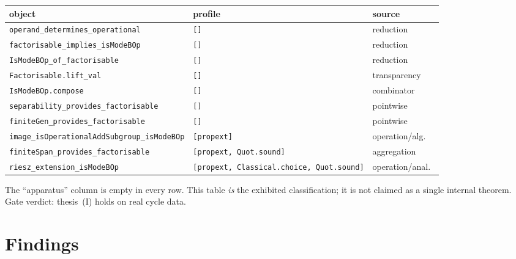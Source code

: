 \begin{center}
\begin{tabular}{lll}
\textbf{object} & \textbf{profile} & \textbf{source} \\
\hline
\texttt{operand\_determines\_operational}      & \texttt{[]}        & reduction \\
\texttt{factorisable\_implies\_isModeBOp}       & \texttt{[]}        & reduction \\
\texttt{IsModeBOp\_of\_factorisable}            & \texttt{[]}        & reduction \\
\texttt{Factorisable.lift\_val}                 & \texttt{[]}        & transparency \\
\texttt{IsModeBOp.compose}                      & \texttt{[]}        & combinator \\
\texttt{separability\_provides\_factorisable}   & \texttt{[]}        & pointwise \\
\texttt{finiteGen\_provides\_factorisable}      & \texttt{[]}        & pointwise \\
\texttt{image\_isOperationalAddSubgroup\_isModeBOp} & \texttt{[propext]} & operation/alg.\ \\
\texttt{finiteSpan\_provides\_factorisable}     & \texttt{[propext, Quot.sound]} & aggregation \\
\texttt{riesz\_extension\_isModeBOp}            & \texttt{[propext, Classical.choice, Quot.sound]} & operation/anal.\ \\
\end{tabular}
\end{center}

The ``apparatus'' column is empty in every row.  This table \emph{is} the exhibited
classification; it is not claimed as a single internal theorem.  Gate verdict:
thesis~(I) holds on real cycle data.

\section{Findings}
\label{sec:transit_findings}

